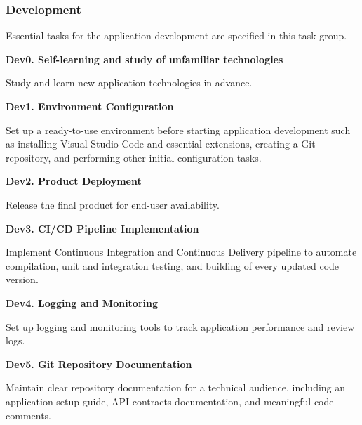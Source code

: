 \subsubsection{Development}

Essential tasks for the application development are specified in this task group.

\textbf{Dev0. Self-learning and study of unfamiliar technologies}

Study and learn new application technologies in advance.

\textbf{Dev1. Environment Configuration}

Set up a ready-to-use environment before starting application development such as installing Visual Studio Code and essential extensions, creating a Git repository, and performing other initial configuration tasks. 

\textbf{Dev2. Product Deployment}

Release the final product for end-user availability.

\textbf{Dev3. CI/CD Pipeline Implementation}

Implement Continuous Integration and Continuous Delivery pipeline to automate compilation, unit and integration testing, and building of every updated code version.

\textbf{Dev4. Logging and Monitoring}

Set up logging and monitoring tools to track application performance and review logs.

\textbf{Dev5. Git Repository Documentation}

Maintain clear repository documentation for a technical audience, including an application setup guide, API contracts documentation, and meaningful code comments.
